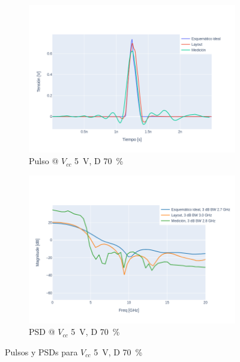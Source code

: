 \begin{figure}[t!]
    \centering
    \begin{subfigure}[b]{0.49\textwidth}
        \centering
        \includegraphics[width=\textwidth]{images/plots/Vcc_5V_duty_70_time_domain.png}
        \caption{Pulso @ $V_{cc}$ \qty{5}{\volt}, D \qty{70}{\percent} }
        \label{fig:pulses_5v_70}
    \end{subfigure}
    \hfill
    \begin{subfigure}[b]{0.49\textwidth}
        \centering
        \includegraphics[width=\textwidth]{images/plots/Vcc_5V_duty_70_psd.png}
        \caption{PSD @ $V_{cc}$ \qty{5}{\volt}, D \qty{70}{\percent} }
        \label{fig:psd_5v_70}
    \end{subfigure}
    \caption{Pulsos y PSDs para $V_{cc}$ \qty{5}{\volt}, D \qty{70}{\percent} }
    \label{fig:plots_5v_70}
\end{figure}

